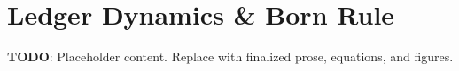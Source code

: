 
\section{Ledger Dynamics & Born Rule}
\label{sec:ledger-dynamics-born-rule}

\textbf{TODO}: Placeholder content. Replace with finalized prose, equations, and figures.

